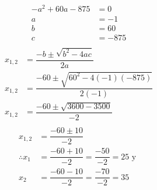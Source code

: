 \begin{solutionbox}{4.5cm}
    \begin{multicols}{3}
        \[
            \begin{array}{rl}
                -a^2+60a-875 & =0    \\
                a            & =-1   \\
                b            & =60   \\
                c            & =-875 \\
            \end{array}
        \]
        \vspace{1cm}
        \[
            \begin{array}{rl}
                x_{1,2} & = \dfrac{-b\pm\sqrt{b^2-4ac}}{2a}              \\[1.5em]
                x_{1,2} & = \dfrac{-60\pm\sqrt{60^2-4(-1)(-875)}}{2(-1)} \\[1.5em]
                x_{1,2} & = \dfrac{-60\pm\sqrt{3600-3500}}{-2}           \\[1.5em]
            \end{array}
        \]
        \[
            \begin{array}{rl}
                x_{1,2}        & = \dfrac{-60\pm 10}{-2}                            \\[1.5em]
                \therefore x_1 & = \dfrac{-60+10}{-2}=\dfrac{-50}{-2}=25 \text{ y } \\[1.5em]
                x_2            & = \dfrac{-60-10}{-2}=\dfrac{-70}{-2}=35            \\[1.5em]
            \end{array}
        \]
    \end{multicols}
\end{solutionbox}
